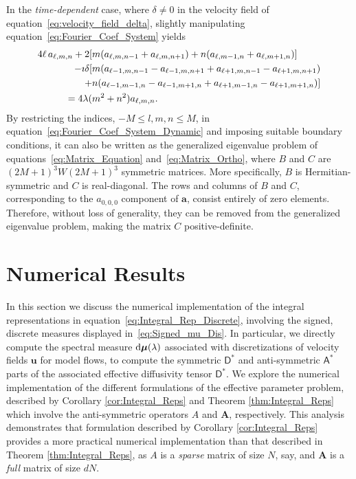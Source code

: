 \documentclass[leqno,onefignum,onetabnum]{siamltex1213}
\renewcommand{\d}{\mathrm{d}}
\newcommand{\Ab}{\mathbf{A}}
\newcommand{\Dm}{\mathsf{D}}
\newcommand{\Am}{\mathsf{A}}
\newcommand\bmu{\mbox{\boldmath${\mu}$}}
\newcommand{\veca}{\boldsymbol{a}}
\newcommand{\vecu}{\boldsymbol{u}}
\begin{document}
In the \emph{time-dependent} case, where $\delta\neq0$ in the velocity field
of equation~\eqref{eq:velocity_field_delta}, slightly manipulating
equation~\eqref{eq:Fourier_Coef_System} yields  
%
\begin{align}\label{eq:Fourier_Coef_System_Dynamic}
4\ell\,a_{\ell,m,n}
+2[&m(a_{\ell,m,n-1}+a_{\ell,m,n+1})+n(a_{\ell,m-1,n}+a_{\ell,m+1,n})]
\notag\\
-\imath\delta[&m(a_{\ell-1,m,n-1}-a_{\ell-1,m,n+1}+a_{\ell+1,m,n-1}-a_{\ell+1,m,n+1})\notag\\
    +&n(a_{\ell-1,m-1,n}-a_{\ell-1,m+1,n}+a_{\ell+1,m-1,n}-a_{\ell+1,m+1,n})] 
\notag\\
=4\lambda(&m^2+n^2)a_{\ell,m,n}.
\end{align}
%
By restricting the indices, $-M\leq l,m,n\leq M$, in
equation~\eqref{eq:Fourier_Coef_System_Dynamic} and imposing suitable
boundary  
conditions, it can also be
written as the generalized eigenvalue problem of
equations~\eqref{eq:Matrix_Equation} and~\eqref{eq:Matrix_Ortho},
where  $B$ and 
$C$ are $(2M+1)^3W(2M+1)^3$ symmetric matrices. More specifically,
$B$ is Hermitian-symmetric and $C$ is real-diagonal. The rows and
columns of $B$ and $C$, corresponding to the $a_{0,0,0}$ component of
$\veca$, consist entirely of zero elements. Therefore, without loss
of generality, they can be removed from the generalized eigenvalue
problem, making the matrix $C$ positive-definite.  







\section{Numerical Results}\label{sec:Num_Results}
%
In this section we discuss the numerical implementation of the
integral representations in equation~\eqref{eq:Integral_Rep_Discrete},
involving the signed, discrete measures displayed
in~\eqref{eq:Signed_mu_Dis}. In particular, we directly compute the 
spectral measure $\d\bmu(\lambda)$ associated with discretizations of
velocity fields $\vecu $ for model flows, to compute the symmetric
$\Dm^*$ and anti-symmetric $\Am^*$ parts of the associated
effective diffusivity tensor $\Dm^*$. We explore the numerical
implementation of the different formulations of the effective
parameter problem, described by Corollary \ref{cor:Integral_Reps} and
Theorem \ref{thm:Integral_Reps} which involve the anti-symmetric
operators $A$ and $\Ab$, respectively. This analysis demonstrates that
formulation described by Corollary \ref{cor:Integral_Reps} provides a
more practical numerical implementation than that described in Theorem
\ref{thm:Integral_Reps}, as $A$ is a \emph{sparse} matrix of size $N$,
say, and $\Ab$ is a \emph{full} matrix of size $dN$.    
\end{document}
